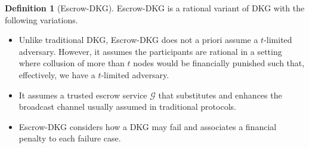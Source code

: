 \documentclass[letterpaper,twocolumn,10pt]{article}
\theoremstyle{definition}
\newtheorem{definition}[theorem]{Definition}
\theoremstyle{remark}
\begin{document}
\begin{definition}[Escrow-DKG]
Escrow-DKG \cite{david2019rational} is a rational variant of DKG with the following variations.
\begin{itemize}
    \item Unlike traditional DKG, Escrow-DKG does not a priori assume a $t$-limited adversary. However, it assumes the participants are rational in a setting where collusion of more than $t$ nodes would be financially punished such that, effectively, we have a $t$-limited adversary.
    \item It assumes a trusted escrow service $\mathcal{G}$ that substitutes and enhances the broadcast channel usually assumed in traditional protocols.
    \item Escrow-DKG considers how a DKG may fail and associates a financial penalty to each failure case.
\end{itemize}
\end{definition}
\end{document}

